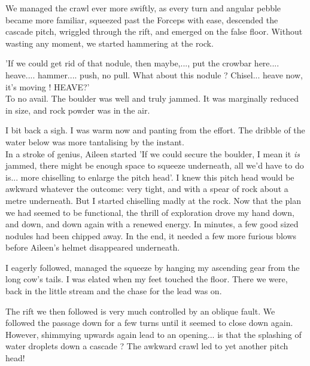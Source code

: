 We managed the crawl ever more swiftly, as every turn and angular pebble became more familiar, squeezed past the Forceps with ease, descended the cascade pitch, wriggled through the rift, and emerged on the false floor. Without wasting any moment, we started hammering at the rock. 

'If we could get rid of that nodule, then maybe,..., put the crowbar here.... heave.... hammer.... push, no pull. What about this nodule ? Chisel... heave now, it's moving ! HEAVE?'\\ 
To no avail. The boulder was well and truly jammed. It was marginally reduced in size, and rock powder was in the air.

I bit back a sigh. I was warm now and panting from the effort. The dribble of the water below was more tantalising by the instant. \\
In a stroke of genius, Aileen started 'If we could secure the boulder, I mean it \emph{is} jammed, there might be enough space to squeeze underneath, all we'd have to do is... more chiselling to enlarge the pitch head'.
I knew this pitch head would be awkward whatever the outcome: very tight, and with a spear of rock about a metre underneath. But I started chiselling madly at the rock. Now that the plan we had seemed to be functional, the thrill of exploration drove my hand down, and down, and down again with a renewed energy. In minutes, a few good sized nodules had been chipped away. In the end, it needed a few more furious blows before Aileen's helmet disappeared underneath.

I eagerly followed, managed the squeeze by hanging my ascending gear from the long cow's tails. I was elated when my feet touched the floor. There we were, back in the little stream and the chase for the lead was on.





The rift we then followed is very much controlled by an oblique fault. We followed the passage down for a few turns until it seemed to close down again. However, shimmying upwards again lead to an opening... is that the splashing of water droplets down a cascade ? The awkward crawl led to yet another pitch head!

